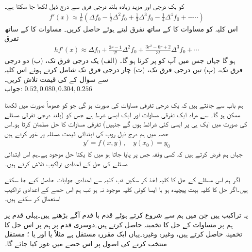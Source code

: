  کو یک درجی اور مزید زیادہ بلند درجی فرق سے درج ذیل لکھا جا سکتا ہے۔ 
\begin{align*}
f'(x)\approx \frac{1}{h}(\Delta f_0-\frac{1}{2}\Delta^2 f_0+\frac{1}{3}\Delta^3f_0-\frac{1}{4}\Delta^4 f_0+-\cdots)
\end{align*}
اس کلیہ کو مساوات  کا  کے ساتھ تفرق لیتے ہوئے حاصل کریں۔ مساوات  کا  کے ساتھ تفرق
\begin{align*}
hf'(x)\approx \Delta f_0+\frac{2r-1}{2!}\Delta^2 f_0+\frac{3r^2-6r+2}{3!}\Delta^3f_0+\cdots
\end{align*}
ہو گا جہاں  جس میں آپ کو  پر کرنا ہو گا۔ (الف) یک درجی فرق تک، (ب) دو درجی فرق تک، (پ) تین درجی فرق تک، (ت) چار درجی فرق تک  شامل کرتے ہوئے  اس کلیہ سے  سوال  کے  کی قیمت تلاش کریں۔ \\
جواب:\quad
$0.52, 0.080, 0.304, 0.256$

ہم باب  سے جانتے ہیں کہ یک درجی تفرقی مساوات کی صورت  ہو گی جو کو عموماً  صورت میں لکھنا ممکن ہو گا۔ سے مراد ایک تفرقی مساوات اور ایک ایسی شرط ہے  جس کو (بلند درجی تفرقی مسئلے کی صورت میں ایک ہی  پر ایسی کئی شرائط ہوں گے جنہیں) تفرقی مساوات کا حل مطمئن کرتا ہو۔اس حصہ میں ہم درج ذیل روپ کی ابتدائی قیمت مسئلہ پر غور کرتے ہیں
\begin{align}\label{مساوات_اعدادی_ابتدائی_مسئلہ_الف}
y'=f(x,y),\quad y(x_0)=y_0
\end{align}
جہاں ہم فرض کرتے ہیں کہ کسی وقفہ جس پر  پایا جاتا ہو میں  کا یکتا حل موجود ہے۔ہم اس ابتدائی مسئلے کی حل کے اعدادی تراکیب تلاش کرتے ہیں۔

اگر ہم اس مسئلے کے حل کا کلیہ اخذ کر سکیں تب کلیہ سے اعدادی جوابات حاصل کیے جا سکتے ہیں۔اگر حل کا کلیہ بہت پیچیدہ ہو یا ایسا کوئی کلیہ موجود نہ ہو تب ہم اس حصے کے  اعدادی تراکیب استعمال کر سکتے ہیں۔

یہ تراکیب  ہیں جن میں ہم   سے شروع کرتے ہوئے قدم با قدم آگے بڑھتے ہیں۔پہلی قدم پر ہم   پر مساوات  کے حل  کا تخمینہ  حاصل کرتے ہیں۔دوسری قدم پر ہم   پر اس حل کا تخمینہ  حاصل کرتے ہیں، وغیرہ وغیرہ۔یہاں  ایک مقررہ مستقل ہے مثلاً  یا  اور یا ؛ مستقل  منتخب کرنے کی اصول پر اس حصے میں غور کیا جائے گا۔

